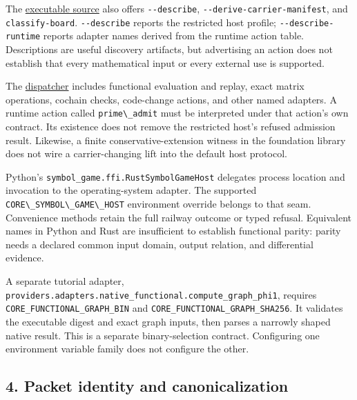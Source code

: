 \documentclass[
  11pt,
]{article}
\newcommand{\passthrough}[1]{#1}
\begin{document}
The
\href{https://github.com/dbccpage/the_symbol_game/blob/52cb5457f6c485ba548cfd292f6012a941ed22cf/engine/crates_rs/core_symbol_game/src/main.rs}{executable
source} also offers \passthrough{\lstinline!--describe!},
\passthrough{\lstinline!--derive-carrier-manifest!}, and
\passthrough{\lstinline!classify-board!}.
\passthrough{\lstinline!--describe!} reports the restricted host
profile; \passthrough{\lstinline!--describe-runtime!} reports adapter
names derived from the runtime action table. Descriptions are useful
discovery artifacts, but advertising an action does not establish that
every mathematical input or every external use is supported.

The
\href{https://github.com/dbccpage/the_symbol_game/blob/52cb5457f6c485ba548cfd292f6012a941ed22cf/engine/crates_rs/core_symbol_game/src/invoke.rs}{dispatcher}
includes functional evaluation and replay, exact matrix operations,
cochain checks, code-change actions, and other named adapters. A runtime
action called \passthrough{\lstinline!prime\_admit!} must be interpreted
under that action's own contract. Its existence does not remove the
restricted host's refused admission result. Likewise, a finite
conservative-extension witness in the foundation library does not wire a
carrier-changing lift into the default host protocol.

Python's \nolinkurl{symbol_game.ffi.RustSymbolGameHost}
delegates process location and invocation to the operating-system
adapter. The supported
\passthrough{\lstinline!CORE\_SYMBOL\_GAME\_HOST!} environment override
belongs to that seam. Convenience methods retain the full railway
outcome or typed refusal. Equivalent names in Python and Rust are
insufficient to establish functional parity: parity needs a declared
common input domain, output relation, and differential evidence.

A separate tutorial adapter,
\nolinkurl{providers.adapters.native_functional.compute_graph_phi1},
requires \nolinkurl{CORE_FUNCTIONAL_GRAPH_BIN} and
\nolinkurl{CORE_FUNCTIONAL_GRAPH_SHA256}. It validates the executable
digest and exact graph inputs, then parses a narrowly shaped native
result. This is a separate binary-selection contract. Configuring one
environment variable family does not configure the other.

\subsection{4. Packet identity and
canonicalization}\label{packet-identity-and-canonicalization}
\end{document}
